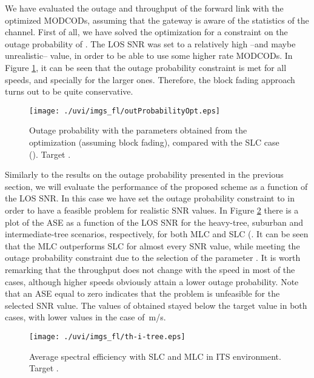 \documentclass[journal,onecolumn,10pt,a4paper]{IEEEtran}
\begin{document}
We have evaluated the outage and throughput of the forward link with the optimized MODCODs, assuming that the gateway is aware of the statistics of the channel. First of all, we have solved the optimization for a constraint on the outage probability of . The LOS SNR was set to a relatively high --and maybe unrealistic-- value, in order to be able to use some higher rate MODCODs. In Figure \ref{outProbabilityOpt}, it can be seen that the outage probability constraint is met for all speeds, and specially for the larger ones. Therefore, the block fading approach turns out to be quite conservative.
 
\begin{figure}
\begin{center}

 \texttt{[image: ./uvi/imgs\_fl/outProbabilityOpt.eps]}
\caption{Outage probability with the parameters obtained from the optimization (assuming block fading), compared with the SLC case (). Target .}

\label{outProbabilityOpt}\end{center}
\end{figure}

Similarly to the results on the outage probability presented in the previous section, we will evaluate the performance of the proposed scheme as a function of the LOS SNR. In this case we have set the outage probability constraint to  in order to have a feasible problem for realistic SNR values. In Figure \ref{f:th-i-tree} there is a plot of the ASE as a function of the LOS SNR for the heavy-tree, suburban and intermediate-tree scenarios, respectively, for both MLC and SLC (. It can be seen that the MLC outperforms SLC for almost every SNR value, while meeting the outage probability constraint due to the selection of the parameter . It is worth remarking that the throughput does not change with the speed in most of the cases, although higher speeds obviously attain a lower outage probability. Note that an ASE equal to zero indicates that the problem is unfeasible for the selected SNR value. The values of  obtained stayed below the target value in both cases, with lower values in the case of \,m/s.

\begin{figure}
\begin{center}
 \texttt{[image: ./uvi/imgs\_fl/th-i-tree.eps]}
\caption{Average spectral efficiency with SLC and MLC in ITS environment. Target .}
\label{f:th-i-tree}\end{center}
\end{figure}
\end{document}

